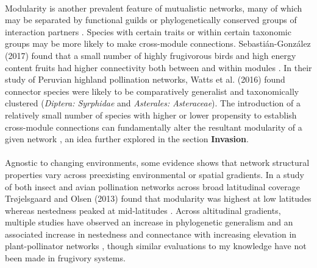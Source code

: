 \paragraph*{}
Modularity is another prevalent feature of mutualistic networks, many of which may be separated by functional guilds \parencite{ramos2018modularity} or phylogenetically conserved groups of interaction partners \parencite{Gonzales2015macroecology}. Species with certain traits or within certain taxonomic groups may be more likely to make cross-module connections. Sebasti{\'a}n-Gonz{\'a}lez (2017) found that a small number of highly frugivorous birds and high energy content fruits had higher connectivity both between and within modules \parencite{sebastian2017drivers}. In their study of Peruvian highland pollination networks, Watts et al. (2016) found connector species were likely to be comparatively generalist and taxonomically clustered (\textit{Diptera: Syrphidae} and \textit{Asterales: Asteraceae}). The introduction of a relatively small number of species with higher or lower propensity to establish cross-module connections can fundamentally alter the resultant modularity of a given network \parencite{russo2014patterns}, an idea further explored in the section \textbf{Invasion}.  


\paragraph*{}
Agnostic to changing environments, some evidence shows that network structural properties vary across preexisting environmental or spatial gradients.  In a study of both insect and avian pollination networks across broad latitudinal coverage  Tr{\o}jelsgaard and Olsen (2013) found that modularity was highest at low latitudes whereas nestedness peaked at mid-latitudes \parencite{trojelsgaard2013macroecology}. Across altitudinal gradients, multiple studies have observed an increase in phylogenetic generalism and an associated increase in nestedness and connectance with increasing elevation in plant-pollinator networks \parencite{adedoja2018insect, lara2019beta, classen2020specialization}, though similar evaluations to my knowledge have not been made in frugivory systems. 


